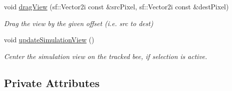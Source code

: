 \begin{DoxyCompactItemize}
void \hyperlink{class_application_a3089c41134287645292eeb587f917f89}{drag\-View} (sf\-::\-Vector2i const \&src\-Pixel, sf\-::\-Vector2i const \&dest\-Pixel)
\begin{DoxyCompactList}\small\item\em Drag the view by the given offset (i.\-e. src to dest) \end{DoxyCompactList}\item 
void \hyperlink{class_application_a5d6a3cc615a2b345167b337c451c8d7e}{update\-Simulation\-View} ()
\begin{DoxyCompactList}\small\item\em Center the simulation view on the tracked bee, if selection is active. \end{DoxyCompactList}\end{DoxyCompactItemize}
\subsection*{Private Attributes}
